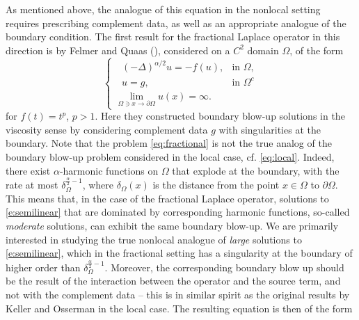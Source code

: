 \documentclass[a4paper,12pt,draft]{article}
\theoremstyle{plain}
\theoremstyle{definition}
\numberwithin{equation}{section}
\newcommand{\1}{1}
\begin{document}
As mentioned above, the analogue of this equation in the nonlocal setting requires prescribing complement data, as well as an appropriate analogue of the boundary condition. The first result for the fractional Laplace operator in this direction is by Felmer and Quaas (\cite{FQ}), considered on a $C^2$ domain $\Omega$, of the form
\begin{equation}\label{eq:fractional}
    \begin{cases}
    \ \ \  (-\Delta)^{\alpha/2} u = -f(u), &\text{in }\Omega,\\
    \ \ \  u=g, & \text{in }\Omega^c\\
     \lim\limits_{\Omega\ni x\to\partial\Omega} u(x)=\infty.  & 
    \end{cases}
\end{equation}
for $f(t)=t^p$, $p>1$. Here they constructed boundary blow-up solutions in the viscosity sense by considering complement data $g$ with singularities at the boundary. Note that the problem \eqref{eq:fractional} is not the true analog of the boundary blow-up problem considered in the local case, cf. \eqref{eq:local}. Indeed, there exist $\alpha$-harmonic functions on $\Omega$ that explode at the boundary, with the rate at most $\delta_\Omega^{\frac\alpha2-1}$, where $\delta_\Omega(x)$ is the distance from the point $x\in \Omega$ to $\partial \Omega$. This means that, in the case of the fractional Laplace operator, solutions to \eqref{e:semilinear} that are dominated by corresponding harmonic functions, so-called \emph{moderate} solutions, can exhibit the same boundary blow-up. We are primarily interested in studying the true nonlocal analogue of \emph{large} solutions to \eqref{e:semilinear}, which in the fractional setting has a singularity at the boundary of higher order than $\delta_\Omega^{\frac\alpha2-1}$. Moreover, the corresponding boundary blow up should be the result of the interaction between the operator and the source term, and not with the complement data -- this is in similar spirit as the original results by Keller and Osserman in the local case. The resulting equation is then of the form 
\end{document}
